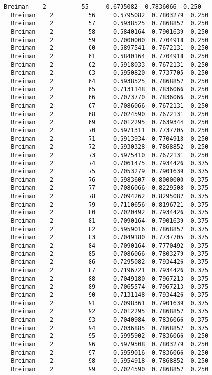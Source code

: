 \documentclass[11pt]{article}
\begin{document}
\begin{Verbatim}[commandchars=\\\{\}]
  Breiman    2          55     0.6795082  0.7836066  0.250
  Breiman    2          56     0.6795082  0.7803279  0.250
  Breiman    2          57     0.6938525  0.7868852  0.250
  Breiman    2          58     0.6840164  0.7901639  0.250
  Breiman    2          59     0.7000000  0.7704918  0.250
  Breiman    2          60     0.6897541  0.7672131  0.250
  Breiman    2          61     0.6840164  0.7704918  0.250
  Breiman    2          62     0.6918033  0.7672131  0.250
  Breiman    2          63     0.6950820  0.7737705  0.250
  Breiman    2          64     0.6938525  0.7868852  0.250
  Breiman    2          65     0.7131148  0.7836066  0.250
  Breiman    2          66     0.7073770  0.7836066  0.250
  Breiman    2          67     0.7086066  0.7672131  0.250
  Breiman    2          68     0.7024590  0.7672131  0.250
  Breiman    2          69     0.7012295  0.7639344  0.250
  Breiman    2          70     0.6971311  0.7737705  0.250
  Breiman    2          71     0.6913934  0.7704918  0.250
  Breiman    2          72     0.6930328  0.7868852  0.250
  Breiman    2          73     0.6975410  0.7672131  0.250
  Breiman    2          74     0.7061475  0.7934426  0.375
  Breiman    2          75     0.7053279  0.7901639  0.375
  Breiman    2          76     0.6983607  0.8000000  0.375
  Breiman    2          77     0.7086066  0.8229508  0.375
  Breiman    2          78     0.7094262  0.8295082  0.375
  Breiman    2          79     0.7110656  0.8196721  0.375
  Breiman    2          80     0.7020492  0.7934426  0.375
  Breiman    2          81     0.7090164  0.7901639  0.375
  Breiman    2          82     0.6959016  0.7868852  0.375
  Breiman    2          83     0.7049180  0.7737705  0.375
  Breiman    2          84     0.7090164  0.7770492  0.375
  Breiman    2          85     0.7086066  0.7803279  0.375
  Breiman    2          86     0.7295082  0.7934426  0.375
  Breiman    2          87     0.7196721  0.7934426  0.375
  Breiman    2          88     0.7049180  0.7967213  0.375
  Breiman    2          89     0.7065574  0.7967213  0.375
  Breiman    2          90     0.7131148  0.7934426  0.375
  Breiman    2          91     0.7098361  0.7901639  0.375
  Breiman    2          92     0.7012295  0.7868852  0.375
  Breiman    2          93     0.7040984  0.7836066  0.375
  Breiman    2          94     0.7036885  0.7868852  0.375
  Breiman    2          95     0.6995902  0.7836066  0.250
  Breiman    2          96     0.6979508  0.7803279  0.250
  Breiman    2          97     0.6959016  0.7836066  0.250
  Breiman    2          98     0.6954918  0.7868852  0.250
  Breiman    2          99     0.7024590  0.7868852  0.250

\end{Verbatim}
\end{document}
